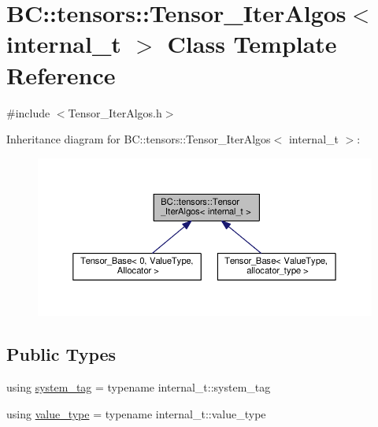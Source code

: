 \hypertarget{classBC_1_1tensors_1_1Tensor__IterAlgos}{}\section{BC\+:\+:tensors\+:\+:Tensor\+\_\+\+Iter\+Algos$<$ internal\+\_\+t $>$ Class Template Reference}
\label{classBC_1_1tensors_1_1Tensor__IterAlgos}


{\ttfamily \#include $<$Tensor\+\_\+\+Iter\+Algos.\+h$>$}



Inheritance diagram for BC\+:\+:tensors\+:\+:Tensor\+\_\+\+Iter\+Algos$<$ internal\+\_\+t $>$\+:
\nopagebreak
\begin{figure}[H]
\begin{center}
\leavevmode
\includegraphics[width=350pt]{classBC_1_1tensors_1_1Tensor__IterAlgos__inherit__graph}
\end{center}
\end{figure}
\subsection*{Public Types}
\begin{DoxyCompactItemize}
\item 
using \hyperlink{classBC_1_1tensors_1_1Tensor__IterAlgos_aedd08c00c4461238b45b81446f4d892d}{system\+\_\+tag} = typename internal\+\_\+t\+::system\+\_\+tag
\item 
using \hyperlink{classBC_1_1tensors_1_1Tensor__IterAlgos_af844f0eb5c403f54c5b466749c296ae0}{value\+\_\+type} = typename internal\+\_\+t\+::value\+\_\+type
\end{DoxyCompactItemize}
